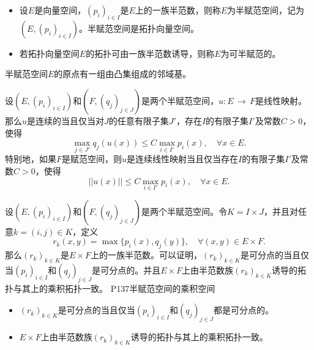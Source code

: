 \begin{definition}
	\begin{itemize}
		\item 设$E$是向量空间，$(p_{i})_{i\in I} $是$E$上的一族半范数，则称$E$为半赋范空间，记为$(E,(p_{i})_{i\in I}) $。半赋范空间是拓扑向量空间。
		\item 若拓扑向量空间$E$的拓扑可由一族半范数诱导，则称$E$为可半赋范的。
	\end{itemize}
\end{definition}

\begin{theorem}\label{XQHthe070202}
	半赋范空间$E$的原点有一组由凸集组成的邻域基。
\end{theorem}

\begin{theorem}
	设$(E,(p_{i})_{i\in I}) $和$(F,(q_{j})_{j\in J}) $是两个半赋范空间，$ u: E\, \rightarrow \, F$是线性映射。那么$u$是连续的当且仅当对$J$的任意有限子集$J' $，存在$I$的有限子集$I'$及常数$C>0$，使得
	\begin{equation*}
		\max_{j\in J'} q_{j}(u(x))\leq C\max_{i\in I'} p_{i}(x),\quad \forall x\in E.
	\end{equation*}
	特别地，如果$F$是赋范空间，则$u$是连续线性映射当且仅当存在$I$的有限子集$I' $及常数$C>0 $，使得
	\begin{equation*}
		||u(x)||\leq C\max_{i\in I'}p_{i}(x),\quad \forall x\in E.
	\end{equation*}
\end{theorem}

\original
{
	设$(E,(p_{i})_{i\in I}) $和$(F,(q_{j})_{j\in J}) $是两个半赋范空间。令$K=I\times J $，并且对任意$k=(i,j) \in K $，定义
	\begin{equation*}
		r_{k}(x,y)=\max\{p_{i}(x),q_{j}(y)\},\quad \forall (x,y)\in E\times F.
	\end{equation*}
	那么$(r_{k})_{k\in K}$是$E\times F $上的一族半范数。可以证明，$(r_{k})_{k\in K} $是可分点的当且仅当$(p_{i})_{i\in I} $和$(q_{j})_{j\in J} $是可分点的。并且$E\times F$上由半范数族$(r_{k})_{k\in K} $诱导的拓扑与其上的乘积拓扑一致。
}
{P137半赋范空间的乘积空间}
\begin{proposition}
	\begin{itemize}
		\item $(r_{k})_{k\in K} $是可分点的当且仅当$(p_{i})_{i\in I} $和$(q_{j})_{j\in J} $都是可分点的。
		\item $E\times F$上由半范数族$(r_{k})_{k\in K} $诱导的拓扑与其上的乘积拓扑一致。
	\end{itemize}
\end{proposition}

